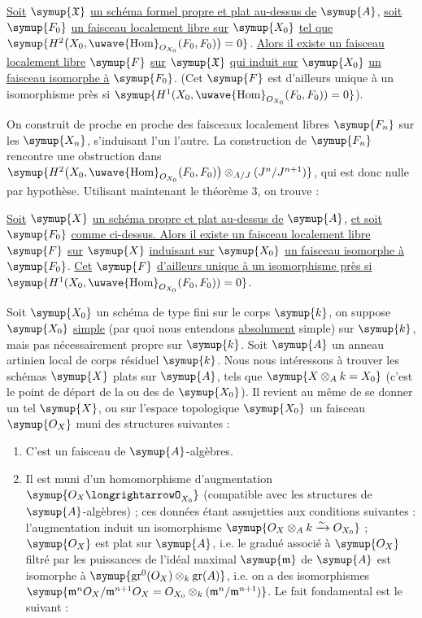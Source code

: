  \uline{Soit} $\symup{\mathfrak X}$ \uline{un schéma formel propre et plat
au-dessus de} $\symup{A}$, \uline{soit} $\symup{F_0}$ \uline{un faisceau localement libre sur} $\symup{X_0}$ \uline{tel que}
$\symup{H^2\bigl(X_0,\mathop{\text{\uwave{Hom}}}\nolimits_{O_{X_0}}(F_0,F_0)\bigr)=0}$.
\uline{Alors il existe un faisceau localement libre} $\symup{F}$ \uline{sur} $\symup{\mathfrak X}$ \uline{qui induit
sur} $\symup{X_0}$ \uline{un faisceau isomorphe à} $\symup{F_0}$. (Cet $\symup{F}$ est d'ailleurs unique à un
isomorphisme près si
$\symup{H^1(X_0,\mathop{\text{\uwave{Hom}}}\nolimits_{O_{X_0}}(F_0,F_0))=0}$).

On construit de proche en proche des faisceaux localement libres $\symup{F_n}$ sur les
$\symup{X_n}$, s'induisant l'un l'autre. La construction de $\symup{F_n}$ rencontre une
obstruction dans
$\symup{H^2\bigl(X_0,\mathop{\text{\uwave{Hom}}}\nolimits_{O_{X_0}}(F_0,F_0)\bigr) \otimes_{A/J}(J^n/J^{n+1})}$,
qui est donc nulle par hypothèse. Utilisant maintenant le théorème 3, on
trouve :

 \uline{Soit} $\symup{X}$ \uline{un schéma propre et plat au-dessus de} $\symup{A}$, \uline{et
soit} $\symup{F_0}$ \uline{comme ci-dessus. Alors il existe un faisceau localement libre} $\symup{F}$
\uline{sur} $\symup{X}$ \uline{induisant sur} $\symup{X_0}$ \uline{un faisceau isomorphe à} $\symup{F_0}$. \uline{Cet} $\symup{F}$
\uline{d'ailleurs unique à un isomorphisme près si}
$\symup{H^1(X_0,\mathop{\text{\uwave{Hom}}}\nolimits_{O_{X_0}}(F_0,F_0))=0}$.

Soit $\symup{X_0}$ un schéma de type fini sur le corps $\symup{k}$, on suppose $\symup{X_0}$ \uline{simple}
(par quoi nous entendons \uline{absolument} simple) sur $\symup{k}$, mais pas nécessairement
propre sur $\symup{k}$. Soit $\symup{A}$ un anneau artinien local de corps résiduel $\symup{k}$. Nous
nous intéressons à trouver les schémas $\symup{X}$ plats sur $\symup{A}$, tels que
$\symup{X\otimes_A k=X_0}$ (c'est le point de départ de la  ou
des  de $\symup{X_0}$). Il revient au même de se donner un
tel $\symup{X}$, ou sur l'espace topologique $\symup{X_0}$ un faisceau $\symup{O_X}$ muni des
structures suivantes :
\begin{enumerate}
  \item[\textnormal{i.}] C'est un faisceau de $\symup{A}$-algèbres.
  \item[\textnormal{ii.}] Il est muni d'un homomorphisme d'augmentation
    $\symup{O_X\longrightarrowO_{X_0}}$ (compatible avec les structures de
    $\symup{A}$-algèbres) ; ces données étant assujetties aux conditions suivantes :
    l'augmentation induit un isomorphisme
    $\symup{O_X\otimes_A k\xrightarrow{\sim}O_{X_0}}$ ; $\symup{O_X}$ est plat sur
    $\symup{A}$, i.e. le gradué associé à $\symup{O_X}$ filtré par les puissances de l'idéal
    maximal $\symup{\mathfrak m}$ de $\symup{A}$ est isomorphe à
    $\symup{\operatorname{gr}^0(O_X)\otimes_k\operatorname{gr}(A)}$, i.e. on a des
    isomorphismes
    $\symup{\mathfrak m^nO_X/\mathfrak m^{n+1}O_X =O_{X_0}\otimes_k(\mathfrak m^n/\mathfrak m^{n+1})}$.
Le fait fondamental est le suivant :
\end{enumerate}

